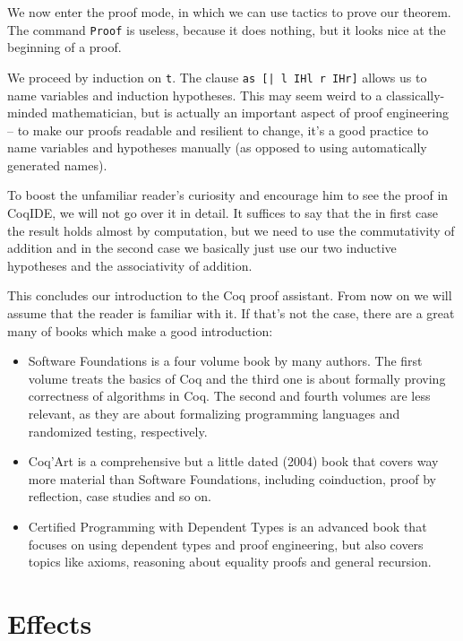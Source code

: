 \documentclass[declaration,inz,english,shortabstract]{iithesis}
\newcommand{\m}[1]{\texttt{#1}}
\begin{document}
We now enter the proof mode, in which we can use tactics to prove our theorem. The command \m{Proof} is useless, because it does nothing, but it looks nice at the beginning of a proof.

We proceed by induction on \m{t}. The clause \m{as [| l IHl r IHr]} allows us to name variables and induction hypotheses. This may seem weird to a classically-minded mathematician, but is actually an important aspect of proof engineering -- to make our proofs readable and resilient to change, it's a good practice to name variables and hypotheses manually (as opposed to using automatically generated names).

To boost the unfamiliar reader's curiosity and encourage him to see the proof in CoqIDE, we will not go over it in detail. It suffices to say that the in first case the result holds almost by computation, but we need to use the commutativity of addition and in the second case we basically just use our two inductive hypotheses and the associativity of addition.

This concludes our introduction to the Coq proof assistant. From now on we will assume that the reader is familiar with it. If that's not the case, there are a great many of books which make a good introduction:

\begin{itemize}
    \item Software Foundations \cite{SoftwareFoundations} is a four volume book by many authors. The first volume treats the basics of Coq and the third one is about formally proving correctness of algorithms in Coq. The second and fourth volumes are less relevant, as they are about formalizing programming languages and randomized testing, respectively.
    \item Coq'Art \cite{CoqArt} is a comprehensive but a little dated (2004) book that covers way more material than Software Foundations, including coinduction, proof by reflection, case studies and so on.
    \item Certified Programming with Dependent Types \cite{CPDT} is an advanced book that focuses on using dependent types and proof engineering, but also covers topics like axioms, reasoning about equality proofs and general recursion.
\end{itemize}

\chapter{Effects}
\end{document}

